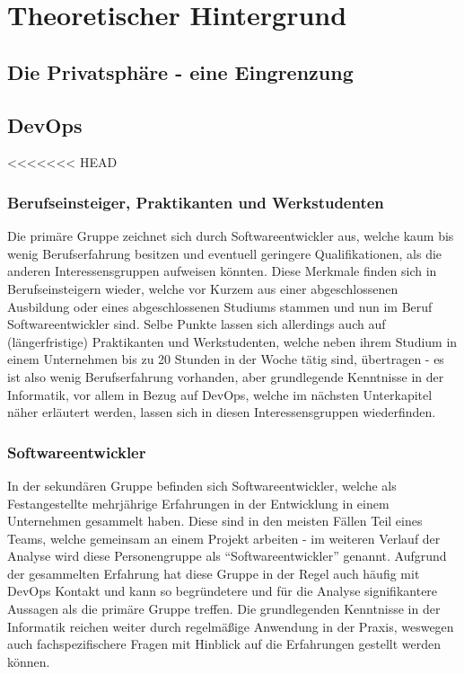 \chapter{Theoretischer Hintergrund} %
\label{Background} %

\section{Die Privatsphäre - eine Eingrenzung}

\section{DevOps}

<<<<<<< HEAD
\subsection{Berufseinsteiger, Praktikanten und Werkstudenten}
Die primäre Gruppe zeichnet sich durch Softwareentwickler aus, welche kaum bis wenig Berufserfahrung besitzen und eventuell geringere Qualifikationen, als die anderen Interessensgruppen aufweisen könnten.
Diese Merkmale finden sich in Berufseinsteigern wieder, welche vor Kurzem aus einer abgeschlossenen Ausbildung oder eines abgeschlossenen Studiums stammen und nun im Beruf Softwareentwickler sind. Selbe Punkte
lassen sich allerdings auch auf (längerfristige) Praktikanten und Werkstudenten, welche neben ihrem Studium in einem Unternehmen bis zu 20 Stunden in der Woche tätig sind, übertragen - es ist also wenig Berufserfahrung
vorhanden, aber grundlegende Kenntnisse in der Informatik, vor allem in Bezug auf DevOps, welche im nächsten Unterkapitel näher erläutert werden, lassen sich in diesen Interessensgruppen wiederfinden.

\subsection{Softwareentwickler}
In der sekundären Gruppe befinden sich Softwareentwickler, welche als Festangestellte mehrjährige Erfahrungen in der Entwicklung in einem Unternehmen gesammelt haben. Diese sind in den meisten Fällen Teil eines Teams, welche gemeinsam an einem Projekt arbeiten
- im weiteren Verlauf der Analyse wird diese Personengruppe als \enquote{Softwareentwickler} genannt. Aufgrund der gesammelten Erfahrung hat diese Gruppe in der Regel auch häufig mit DevOps Kontakt und kann so begründetere und für die Analyse signifikantere
Aussagen als die primäre Gruppe treffen. Die grundlegenden Kenntnisse in der Informatik reichen weiter durch regelmäßige Anwendung in der Praxis, weswegen auch fachspezifischere Fragen mit Hinblick auf die Erfahrungen gestellt werden können.

